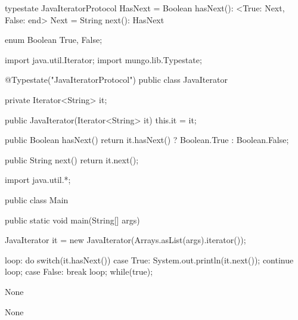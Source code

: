 \begin{code}
typestate JavaIteratorProtocol {
  HasNext = {
    Boolean hasNext(): <True: Next, False: end>
  }
  Next = {
    String next(): HasNext
  }
}\end{code}

\begin{code}
enum Boolean {
	True, False;
}\end{code}

\begin{code}
import java.util.Iterator;
import mungo.lib.Typestate;

@Typestate("JavaIteratorProtocol")
public class JavaIterator {

  private Iterator<String> it;

  public JavaIterator(Iterator<String> it) {
    this.it = it;
  }

	public Boolean hasNext() {
    return it.hasNext() ? Boolean.True : Boolean.False;
  }

  public String next() {
    return it.next();
  }

}\end{code}

\begin{code}
import java.util.*;

public class Main {
	public static void main(String[] args) {
		JavaIterator it = new JavaIterator(Arrays.asList(args).iterator());

    loop: do {
      switch(it.hasNext()) {
        case True:
          System.out.println(it.next());
          continue loop;
        case False:
          break loop;
      }
    } while(true);
	}
}\end{code}

\lstset{caption=Original Mungo output}
\begin{code}
None
\end{code}

\lstset{caption=New Mungo output}
\begin{code}
None
\end{code}

